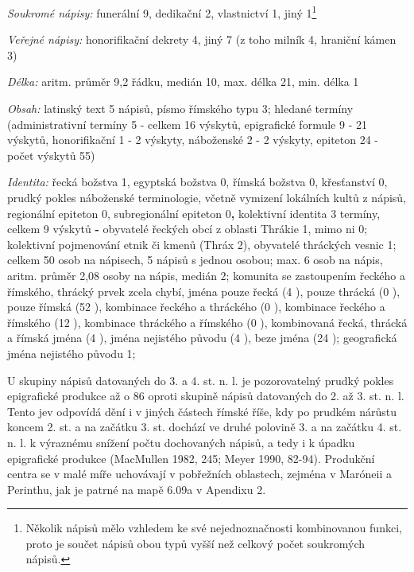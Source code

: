 {\em Soukromé nápisy:} funerální 9, dedikační 2, vlastnictví 1, jiný 1\footnote{Několik nápisů mělo vzhledem ke své nejednoznačnosti kombinovanou funkci, proto je součet nápisů obou typů vyšší než celkový počet soukromých nápisů.}

{\em Veřejné nápisy:} honorifikační dekrety 4, jiný 7 (z toho milník 4, hraniční kámen 3)

{\em Délka:} aritm. průměr 9,2 řádku, medián 10, max. délka 21, min. délka 1

{\em Obsah:} latinský text 5 nápisů, písmo římského typu 3; hledané termíny (administrativní termíny 5 - celkem 16 výskytů, epigrafické formule 9 - 21 výskytů, honorifikační 1 - 2 výskyty, náboženské 2 - 2 výskyty, epiteton 24 - počet výskytů 55)

{\em Identita:} řecká božstva 1, egyptská božstva 0, římská božstva 0, křesťanství 0, prudký pokles náboženské terminologie, včetně vymizení lokálních kultů z nápisů, regionální epiteton 0, subregionální epiteton 0{\bf ,} kolektivní identita 3 termíny, celkem 9 výskytů {\bf -} obyvatelé řeckých obcí z oblasti Thrákie 1, mimo ni 0; kolektivní pojmenování etnik či kmenů (Thráx 2), obyvatelé thráckých vesnic 1; celkem 50 osob na nápisech, 5 nápisů s jednou osobou; max. 6 osob na nápis, aritm. průměr 2,08 osoby na nápis, medián 2; komunita se zastoupením řeckého a římského, thrácký prvek zcela chybí, jména pouze řecká (4 ), pouze thrácká (0 ), pouze římská (52 ), kombinace řeckého a thráckého (0 ), kombinace řeckého a římského (12 ), kombinace thráckého a římského (0 ), kombinovaná řecká, thrácká a římská jména (4 ), jména nejistého původu (4 ), beze jména (24 ); geografická jména nejistého původu 1;

\NC\AR
\HL
\HL
\stoptable

U skupiny nápisů datovaných do 3. a 4. st. n. l. je pozorovatelný prudký pokles epigrafické produkce až o 86  oproti skupině nápisů datovaných do 2. až 3. st. n. l. Tento jev odpovídá dění i v jiných částech římské říše, kdy po prudkém nárůstu koncem 2. st. a na začátku 3. st. dochází ve druhé polovině 3. a na začátku 4. st. n. l. k výraznému snížení počtu dochovaných nápisů, a tedy i k úpadku epigrafické produkce (MacMullen 1982, 245; Meyer 1990, 82-94). Produkční centra se v malé míře uchovávají v pobřežních oblastech, zejména v Maróneii a Perinthu, jak je patrné na mapě 6.09a v Apendixu 2.

